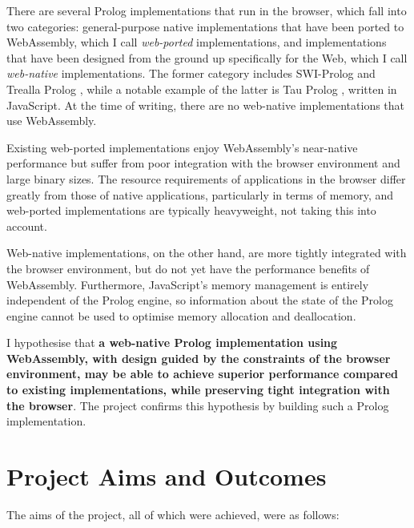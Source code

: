 There are several Prolog implementations that run in the browser, which fall into two categories: general-purpose native implementations that have been ported to WebAssembly, which I call \emph{web-ported} implementations, and implementations that have been designed from the ground up specifically for the Web, which I call \emph{web-native} implementations. The former category includes SWI-Prolog \cite{wielemakerSWIProlog2012} and Trealla Prolog \cite{davisonTreallaProloghttps2020}, while a notable example of the latter is Tau Prolog \cite{riazaTauPrologProlog2024}, written in JavaScript. At the time of writing, there are no web-native implementations that use WebAssembly.

Existing web-ported implementations enjoy WebAssembly's near-native performance but suffer from poor integration with the browser environment and large binary sizes. The resource requirements of applications in the browser differ greatly from those of native applications, particularly in terms of memory, and web-ported implementations are typically heavyweight, not taking this into account.

Web-native implementations, on the other hand, are more tightly integrated with the browser environment, but do not yet have the performance benefits of WebAssembly. Furthermore, JavaScript's memory management is entirely independent of the Prolog engine, so information about the state of the Prolog engine cannot be used to optimise memory allocation and deallocation.

I hypothesise that \textbf{a web-native Prolog implementation using WebAssembly, with design guided by the constraints of the browser environment, may be able to achieve superior performance compared to existing implementations, while preserving tight integration with the browser}. The project confirms this hypothesis by building such a Prolog implementation.

\section{Project Aims and Outcomes}

The aims of the project, all of which were achieved, were as follows:

